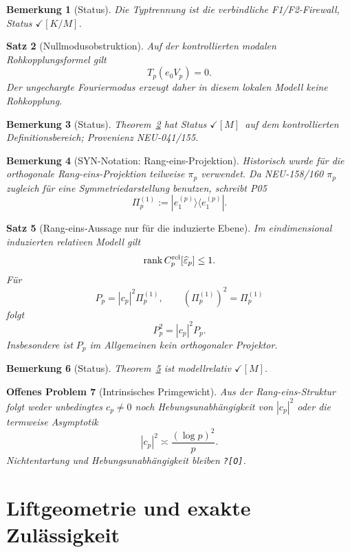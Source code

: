\documentclass[11pt,a4paper]{amsart}
\newtheorem{theorem}{Satz}[section]
\newtheorem{remark}[theorem]{Bemerkung}
\newtheorem{openproblem}[theorem]{Offenes Problem}
\newcommand{\stM}{\ensuremath{\checkmark[M]}}
\newcommand{\stKM}{\ensuremath{\checkmark[K/M]}}
\newcommand{\Open}{\texttt{?[O]}}
\begin{document}
\begin{remark}[Status]
Die Typtrennung ist die verbindliche F1/F2-Firewall, Status \stKM.
\end{remark}

\begin{theorem}[Nullmodusobstruktion]\label{thm:null-mode}
Auf der kontrollierten modalen Rohkopplungsformel gilt
\[
T_p(e_0V_p)=0.
\]
Der ungechargte Fouriermodus erzeugt daher in diesem lokalen Modell keine
Rohkopplung.
\end{theorem}

\begin{remark}[Status]
Theorem~\ref{thm:null-mode} hat Status \stM\ auf dem kontrollierten
Definitionsbereich; Provenienz NEU-041/155.
\end{remark}

\begin{remark}[SYN-Notation: Rang-eins-Projektion]
Historisch wurde für die orthogonale Rang-eins-Projektion teilweise $\pi_p$
verwendet. Da NEU-158/160 $\pi_p$ zugleich für eine Symmetriedarstellung
benutzen, schreibt P05
\[
\boxed{\Pi_p^{(1)}:=|e_1^{(p)}\rangle\langle e_1^{(p)}|.}
\]
\end{remark}

\begin{theorem}[Rang-eins-Aussage nur für die induzierte Ebene]
\label{thm:rank-one}
Im eindimensional induzierten relativen Modell gilt
\[
\operatorname{rank}C_p^{\rm rel}[\widehat\varepsilon_p]\le1.
\]
Für
\[
P_p=|c_p|^2\Pi_p^{(1)},\qquad
(\Pi_p^{(1)})^2=\Pi_p^{(1)}
\]
folgt
\[
P_p^2=|c_p|^2P_p.
\]
Insbesondere ist $P_p$ im Allgemeinen kein orthogonaler Projektor.
\end{theorem}

\begin{remark}[Status]
Theorem~\ref{thm:rank-one} ist modellrelativ \stM.
\end{remark}

\begin{openproblem}[Intrinsisches Primgewicht]\label{op:intrinsic-cp}
Aus der Rang-eins-Struktur folgt weder unbedingtes $c_p\neq0$ noch
Hebungsunabhängigkeit von $|c_p|^2$ oder die termweise Asymptotik
\[
|c_p|^2\asymp\frac{(\log p)^2}{p}.
\]
Nichtentartung und Hebungsunabhängigkeit bleiben \Open.
\end{openproblem}

\section{Liftgeometrie und exakte Zulässigkeit}
\end{document}
